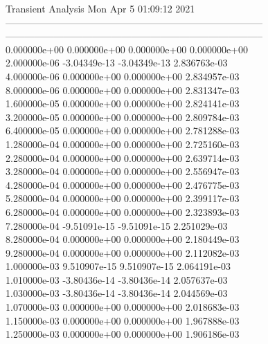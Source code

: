                                    Transient Analysis  Mon Apr  5 01:09:12  2021\\ \hline
--------------------------------------------------------------------------------\\ \hline
--------------------------------------------------------------------------------\\ 	0.000000e+00	0.000000e+00	0.000000e+00	0.000000e+00	\\ 	2.000000e-06	-3.04349e-13	-3.04349e-13	2.836763e-03	\\ 	4.000000e-06	0.000000e+00	0.000000e+00	2.834957e-03	\\ 	8.000000e-06	0.000000e+00	0.000000e+00	2.831347e-03	\\ 	1.600000e-05	0.000000e+00	0.000000e+00	2.824141e-03	\\ 	3.200000e-05	0.000000e+00	0.000000e+00	2.809784e-03	\\ 	6.400000e-05	0.000000e+00	0.000000e+00	2.781288e-03	\\ 	1.280000e-04	0.000000e+00	0.000000e+00	2.725160e-03	\\ 	2.280000e-04	0.000000e+00	0.000000e+00	2.639714e-03	\\ 	3.280000e-04	0.000000e+00	0.000000e+00	2.556947e-03	\\ 	4.280000e-04	0.000000e+00	0.000000e+00	2.476775e-03	\\ 	5.280000e-04	0.000000e+00	0.000000e+00	2.399117e-03	\\ 	6.280000e-04	0.000000e+00	0.000000e+00	2.323893e-03	\\ 	7.280000e-04	-9.51091e-15	-9.51091e-15	2.251029e-03	\\ 	8.280000e-04	0.000000e+00	0.000000e+00	2.180449e-03	\\ 	9.280000e-04	0.000000e+00	0.000000e+00	2.112082e-03	\\ 	1.000000e-03	9.510907e-15	9.510907e-15	2.064191e-03	\\ 	1.010000e-03	-3.80436e-14	-3.80436e-14	2.057637e-03	\\ 	1.030000e-03	-3.80436e-14	-3.80436e-14	2.044569e-03	\\ 	1.070000e-03	0.000000e+00	0.000000e+00	2.018683e-03	\\ 	1.150000e-03	0.000000e+00	0.000000e+00	1.967888e-03	\\ 	1.250000e-03	0.000000e+00	0.000000e+00	1.906186e-03	\\ \hline
